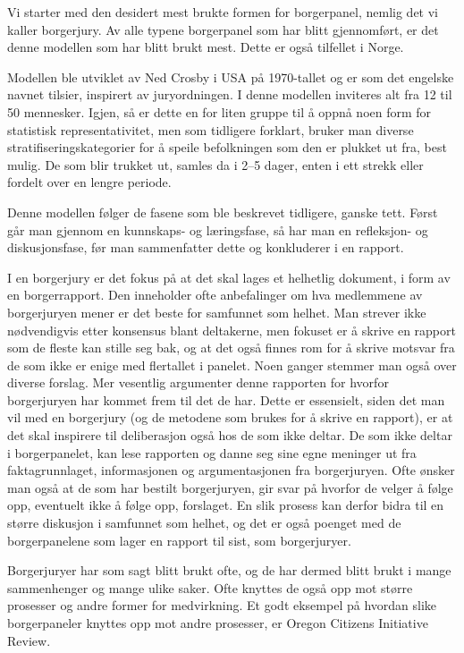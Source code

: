 \documentclass[
  12pt,
  a4paper, 12pt]{article}
\begin{document}
Vi starter med den desidert mest brukte formen for borgerpanel, nemlig det vi kaller borgerjury. Av alle typene borgerpanel som har blitt gjennomført, er det denne modellen som har blitt brukt mest. Dette er også tilfellet i Norge.

Modellen ble utviklet av Ned Crosby i USA på 1970-tallet og er som det engelske navnet tilsier, inspirert av juryordningen. I denne modellen inviteres alt fra 12 til 50 mennesker. Igjen, så er dette en for liten gruppe til å oppnå noen form for statistisk representativitet, men som tidligere forklart, bruker man diverse stratifiseringskategorier for å speile befolkningen som den er plukket ut fra, best mulig. De som blir trukket ut, samles da i 2--5 dager, enten i ett strekk eller fordelt over en lengre periode.

Denne modellen følger de fasene som ble beskrevet tidligere, ganske tett. Først går man gjennom en kunnskaps- og læringsfase, så har man en refleksjon- og diskusjonsfase, før man sammenfatter dette og konkluderer i en rapport.

I en borgerjury er det fokus på at det skal lages et helhetlig dokument, i form av en borgerrapport. Den inneholder ofte anbefalinger om hva medlemmene av borgerjuryen mener er det beste for samfunnet som helhet. Man strever ikke nødvendigvis etter konsensus blant deltakerne, men fokuset er å skrive en rapport som de fleste kan stille seg bak, og at det også finnes rom for å skrive motsvar fra de som ikke er enige med flertallet i panelet. Noen ganger stemmer man også over diverse forslag. Mer vesentlig argumenter denne rapporten for hvorfor borgerjuryen har kommet frem til det de har. Dette er essensielt, siden det man vil med en borgerjury (og de metodene som brukes for å skrive en rapport), er at det skal inspirere til deliberasjon også hos de som ikke deltar. De som ikke deltar i borgerpanelet, kan lese rapporten og danne seg sine egne meninger ut fra faktagrunnlaget, informasjonen og argumentasjonen fra borgerjuryen. Ofte ønsker man også at de som har bestilt borgerjuryen, gir svar på hvorfor de velger å følge opp, eventuelt ikke å følge opp, forslaget. En slik prosess kan derfor bidra til en større diskusjon i samfunnet som helhet, og det er også poenget med de borgerpanelene som lager en rapport til sist, som borgerjuryer.

Borgerjuryer har som sagt blitt brukt ofte, og de har dermed blitt brukt i mange sammenhenger og mange ulike saker. Ofte knyttes de også opp mot større prosesser og andre former for medvirkning. Et godt eksempel på hvordan slike borgerpaneler knyttes opp mot andre prosesser, er Oregon Citizens Initiative Review.
\end{document}
